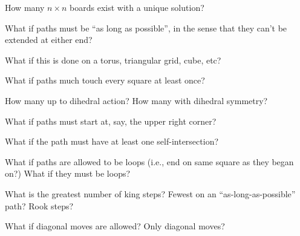 \documentclass{article}
\begin{document}
\begin{question}
  How many $n \times n$ boards exist with a unique solution?
\end{question}

\begin{related}
  \item What if paths must be ``as long as possible'', in the sense that they
    can't be extended at either end?
  \item What if this is done on a torus, triangular grid, cube, etc?
  \item What if paths much touch every square at least once?
  \item How many up to dihedral action? How many with dihedral symmetry?
  \item What if paths must start at, say, the upper right corner?
  \item What if the path must have at least one self-intersection?
  \item What if paths are allowed to be loops (i.e., end on same square as they
    began on?) What if they must be loops?
  \item What is the greatest number of king steps?
    Fewest on an ``as-long-as-possible'' path? Rook steps?
  \item What if diagonal moves are allowed? Only diagonal moves?
\end{related}
\end{document}
